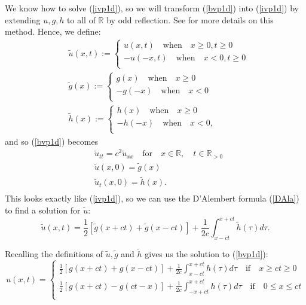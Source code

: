 \documentclass[a4paper, 12pt]{article}
\numberwithin{equation}{section}
\begin{document}
We know how to solve (\ref{ivp1d}), so we will transform (\ref{bvp1d}) into (\ref{ivp1d})
by extending $u,g,h$ to all of $\mathbb{R}$ by odd reflection. See \cite[Ch. 2.4.1]{Ev} for
more details on this method. Hence, we define:
\begin{equation*}
    \begin{aligned}
        &\tilde{u}(x,t):=
        \begin{cases}
            u(x,t) \quad \textrm{when} \quad x \ge 0, t \ge 0\\
            -u(-x,t) \quad \textrm{when} \quad x<0, t \ge 0\\
        \end{cases}
        \\
        &\tilde{g}(x):=
        \begin{cases}
            g(x) \quad \textrm{when} \quad x \ge 0\\
            -g(-x) \quad \textrm{when} \quad x<0\\
        \end{cases}
        \\
        &\tilde{h}(x):=
        \begin{cases}
            h(x) \quad \textrm{when} \quad x \ge 0\\
            -h(-x) \quad \textrm{when} \quad x<0,\\
        \end{cases}
    \end{aligned}
\end{equation*}
and so (\ref{bvp1d}) becomes 
\begin{align*}
    &\tilde{u}_{tt}=c^2\tilde{u}_{xx} \quad \textrm {for} \quad x \in \mathbb{R}, \quad t \in \mathbb{R}_{>0} \\
    &\tilde{u}(x,0)=\tilde{g}(x)\\
    &\tilde{u}_t(x,0)=\tilde{h}(x).\\
\end{align*}
This looks exactly like (\ref{ivp1d}), so we can use the D'Alembert formula
(\ref{DAla}) to find a solution for $\tilde{u}$:
\begin{equation*}
    \tilde{u}(x,t)=\frac{1}{2}\left[\tilde{g}(x+ct)+\tilde{g}(x-ct)\right]+\frac{1}{2c}\int^{x+ct}_{x-ct}\tilde{h}(\tau)d\tau.
\end{equation*}

Recalling the definitions of $\tilde{u}, \tilde{g}$ and $\tilde{h}$ gives us the
solution to (\ref{bvp1d}):
\begin{equation} \label{bvpsol}
    u(x,t)=
    \begin{cases}
        \frac{1}{2}\left[g(x+ct)+g(x-ct)\right]+\frac{1}{2c}\int^{x+ct}_{x-ct}h(\tau)d\tau \quad \textrm{if} \quad x \ge ct \ge 0\\
        \frac{1}{2}\left[g(x+ct)-g(ct-x)\right]+\frac{1}{2c}\int^{x+ct}_{-x+ct}h(\tau)d\tau \quad \textrm{if} \quad 0 \le x \le ct\\
    \end{cases}
\end{equation}
\end{document}
